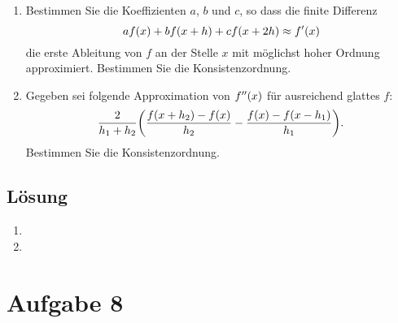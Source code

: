 \documentclass{exercise}
\begin{document}
    \begin{problem}
        \begin{enumerate}
            \item Bestimmen Sie die Koeffizienten \(a\), \(b\) und \(c\), so dass die finite Differenz
            \[
                af\parentheses*{x} + bf\parentheses*{x + h} + cf\parentheses*{x + 2h} \approx f'\parentheses*{x}
            \]
            die erste Ableitung von \(f\) an der Stelle \(x\) mit möglichst hoher Ordnung approximiert.
            Bestimmen Sie die Konsistenzordnung.
            \item Gegeben sei folgende Approximation von \(f''\parentheses*{x}\) für ausreichend glattes \(f\):
            \[
                \frac{2}{h_1 + h_2}\parentheses*{\frac{f\parentheses*{x + h_2} - f\parentheses*{x}}{h_2} - \frac{f\parentheses*{x} - f\parentheses*{x - h_1}}{h_1}}.
            \]
            Bestimmen Sie die Konsistenzordnung.
        \end{enumerate}
    \end{problem}

    \subsection*{Lösung}
    \begin{enumerate}
        \item
        \item
    \end{enumerate}


    \section*{Aufgabe 8}
\end{document}
